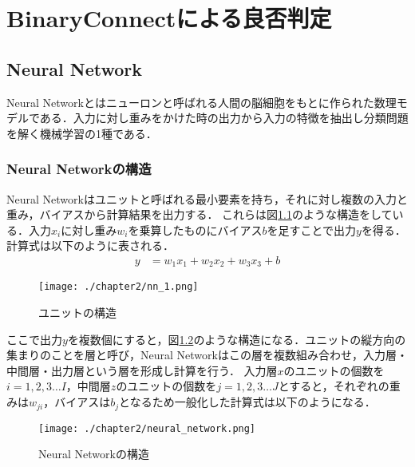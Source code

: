 
\chapter{BinaryConnectによる良否判定}

\section{Neural Network}
Neural Networkとはニューロンと呼ばれる人間の脳細胞をもとに作られた数理モデルである．入力に対し重みをかけた時の出力から入力の特徴を抽出し分類問題を解く機械学習の1種である．


\subsection{Neural Networkの構造}
Neural Networkはユニットと呼ばれる最小要素を持ち，それに対し複数の入力と重み，バイアスから計算結果を出力する．
これらは図\ref{fig_NN1}のような構造をしている．入力$x_i$に対し重み$w_i$を乗算したものにバイアス$b$を足すことで出力$y$を得る．計算式は以下のように表される．
\begin{align}
y &= w_{1}x_{1} + w_{2}x_{2} + w_{3}x_{3} + b
\end{align}
\begin{figure}[]
  \begin{center}
    \texttt{[image: ./chapter2/nn\_1.png]}
    \caption{ユニットの構造}
    \label{fig_NN1}
  \end{center}
\end{figure}

ここで出力$y$を複数個にすると，図\ref{fig_NN}のような構造になる．ユニットの縦方向の集まりのことを層と呼び，Neural Networkはこの層を複数組み合わせ，入力層・中間層・出力層という層を形成し計算を行う．
入力層$x$のユニットの個数を$i=1,2,3\ldots I$，中間層$z$のユニットの個数を$j=1,2,3\ldots J$とすると，それぞれの重みは$w_{ji}$，バイアスは$b_j$となるため一般化した計算式は以下のようになる．
\begin{figure}[]
  \begin{center}
    \texttt{[image: ./chapter2/neural\_network.png]}
    \caption{Neural Networkの構造}
    \label{fig_NN}
  \end{center}
\end{figure}

